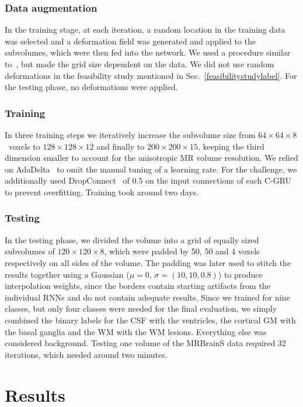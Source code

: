 \documentclass[runningheads,a4paper]{llncs}
\begin{document}
\subsubsection{Data augmentation}
In the training stage, at each iteration, a random location in the training data was selected and a deformation field was generated and applied to the subvolumes, which were then fed into the network. We used a procedure similar to~\cite{ronneberger_u-net:_2015}, but made the grid size dependent on the data. We did not use random deformations in the feasibility study mentioned in Sec.~\ref{feasibilitystudylabel}. For the testing phase, no deformations were applied.

\subsubsection{Training}
In three training steps we iteratively increase the subvolume size from $64\times64\times8$~voxels to $128\times128\times12$ and finally to $200\times200\times15$, keeping the third dimension smaller to account for the anisotropic MR volume resolution. We relied on AdaDelta~\cite{zeiler_adadelta_2012} to omit the manual tuning of a learning rate. For the challenge, we additionally used DropConnect~\cite{icml2013_wan13} of 0.5 on the input connections of each C-GRU to prevent overfitting. Training took around two days.


\subsubsection{Testing}
In the testing phase, we divided the volume into a grid of equally sized subvolumes of $120\times120\times8$, which were padded by 50, 50 and 4 voxels respectively on all sides of the volume. The padding was later used to stitch the results together using a Gaussian ($\mu=0$, $\sigma=(10,10,0.8)$) to produce interpolation weights, since the borders contain starting artifacts from the individual RNNs and do not contain adequate results. Since we trained for nine classes, but only four classes were needed for the final evaluation, we simply combined the binary labels for the CSF with the ventricles, the cortical GM with the basal ganglia and the WM with the WM lesions. Everything else was considered background. Testing one volume of the MRBrainS data required 32 iterations, which needed around two minutes.


\section{Results}
\end{document}
